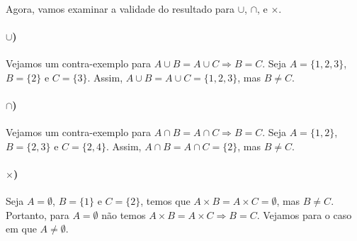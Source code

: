 \documentclass[11pt,a4paper]{report}
\begin{document}
    \paragraph{}
    Agora, vamos examinar a validade do resultado para $\cup$, $\cap$, e $\times$.

    \paragraph{$\cup$)}
    Vejamos um contra-exemplo para $A \cup B = A \cup C \Rightarrow B = C$. Seja $A = \{1, 2, 3\}$, $B = \{2\}$ e $C = \{3\}$. Assim, $A \cup B = A \cup C = \{1, 2, 3\}$, mas $B \not= C$.

    \paragraph{$\cap$)}
    Vejamos um contra-exemplo para $A \cap B = A \cap C \Rightarrow B = C$. Seja $A = \{1, 2\}$, $B = \{2, 3\}$ e $C = \{2, 4\}$. Assim, $A \cap B = A \cap C = \{2\}$, mas $B \not= C$.

    \paragraph{$\times$)}
    Seja $A = \emptyset$, $B = \{1\}$ e $C = \{2\}$, temos que $A \times B = A \times C = \emptyset$, mas $B \not= C$. Portanto, para $A = \emptyset$ não temos $A \times B = A \times C \Rightarrow B = C$. Vejamos para o caso em que $A \not= \emptyset$.
\end{document}
